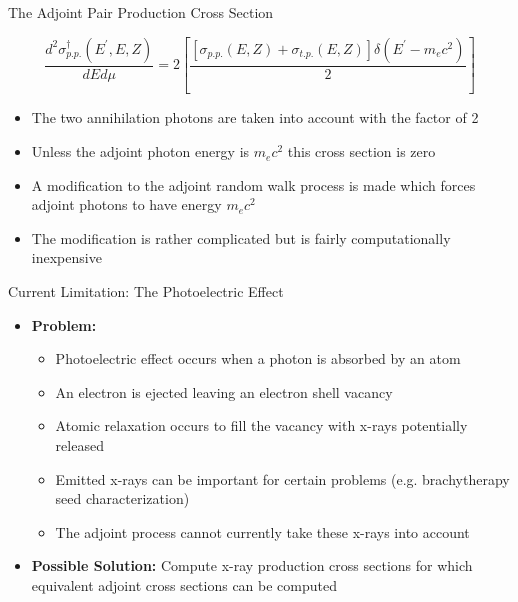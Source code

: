 \documentclass{beamer}
\begin{document}
\begin{frame}{The Adjoint Pair Production Cross Section}

  \begin{equation*}
    \frac{d^2\sigma_{p.p.}^{\dagger}(E^{'},E,Z)}{dEd\mu} = 
    2\left[\frac{\left[\sigma_{p.p.}(E,Z)+\sigma_{t.p.}(E,Z)\right]
      \delta(E^{'}-m_ec^2)}{2}\right] \nonumber
  \end{equation*}

  \bigskip

  \begin{itemize}
    \item The two annihilation photons are taken into account with the
      factor of 2
      \medskip
    \item Unless the adjoint photon energy is $m_ec^2$ this cross section is 
      zero 
      \medskip
    \item A modification to the adjoint random walk process is made which
      forces adjoint photons to have energy $m_ec^2$
      \medskip
    \item The modification is rather complicated but is fairly computationally
      inexpensive 
  \end{itemize}

\end{frame}  

\begin{frame}{Current Limitation: The Photoelectric Effect}

  \begin{itemize}
    \item \textbf{Problem:} 
      \begin{itemize}
        \item Photoelectric effect occurs when a photon is absorbed by an atom
          \medskip
        \item An electron is ejected leaving an electron shell vacancy
          \medskip
        \item Atomic relaxation occurs to fill the vacancy with x-rays 
          potentially released
          \medskip
        \item Emitted x-rays can be important for certain problems (e.g. 
          brachytherapy seed characterization)
          \medskip
        \item The adjoint process cannot currently take these x-rays into 
          account
          \medskip
      \end{itemize}
      \bigskip
    \item \textbf{Possible Solution:} Compute x-ray production cross sections
      for which equivalent adjoint cross sections can be computed
  \end{itemize}

\end{frame}
\end{document}

